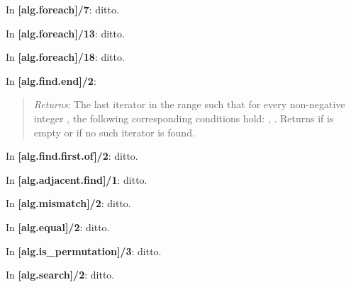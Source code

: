 \documentclass{wg21}
\begin{document}
In \textbf{[alg.foreach]/7}: ditto.

In \textbf{[alg.foreach]/13}: ditto.

In \textbf{[alg.foreach]/18}: ditto.

In \textbf{[alg.find.end]/2}:
\begin{quote}
  \emph{Returns}: The last iterator  in the range
  \tcode{[first1, last1 - (last2 - first2))} such that for every non-negative
  integer , the following corresponding conditions
  hold: ,
  .
  Returns  if \tcode{[first2, last2)} is empty or if no such iterator is found.
\end{quote}

In \textbf{[alg.find.first.of]/2}: ditto.

In \textbf{[alg.adjacent.find]/1}: ditto.

In \textbf{[alg.mismatch]/2}: ditto.

In \textbf{[alg.equal]/2}: ditto.

In \textbf{[alg.is_permutation]/3}: ditto.

In \textbf{[alg.search]/2}: ditto.
\end{document}
